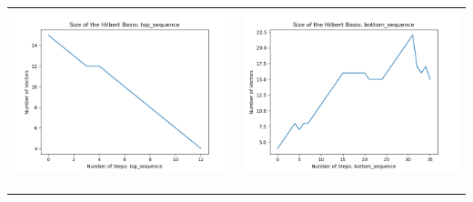\documentclass[10pt]{article}
\begin{document}
\begin{tabular}{c|c}
\begin{minipage}{.4\textwidth}
\includegraphics[width=\textwidth]{"DATA/4d/4 generators 2 bound A/top_sequence SIZE"}
\end{minipage} &
\begin{minipage}{.4\textwidth}
\includegraphics[width=\textwidth]{"DATA/4d/4 generators 2 bound A bottomup/bottom_sequence SIZE"}
\end{minipage} \\ \\
\hline \\\begin{minipage}{.4\textwidth}

\end{minipage}
\end{tabular}
\end{document}
